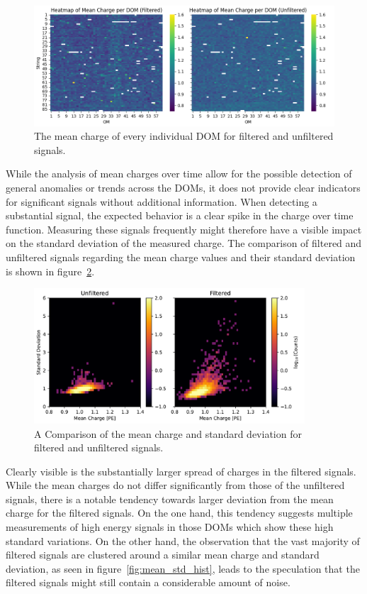 \begin{figure}[H]
    \centering
    \includegraphics[width=\textwidth]{Plots/mean_charge_all_dom.png}
    \caption{The mean charge of every individual DOM for filtered and unfiltered signals.}
    \label{fig:mean_dom_charge_pq}
\end{figure}

While the analysis of mean charges over time allow for the possible detection of general anomalies or trends across the DOMs, it does not provide clear indicators for 
significant signals without additional information. When detecting a substantial signal, the expected behavior is a clear spike in the charge over time function. 
Measuring these signals frequently might therefore have a visible impact on the standard deviation of the measured charge. The comparison of filtered and unfiltered 
signals regarding the mean charge values and their standard deviation is shown in figure~\ref{fig:mean_std_comp}.

\begin{figure}[H]
    \centering
    \includegraphics[width=0.9\textwidth]{Plots/mean_std_charge.pdf}
    \caption{A Comparison of the mean charge and standard deviation for filtered and unfiltered signals.}
    \label{fig:mean_std_comp}
\end{figure}

Clearly visible is the substantially larger spread of charges in the filtered signals. While the mean charges do not differ significantly from those of the 
unfiltered signals, there is a notable tendency towards larger deviation from the mean charge for the filtered signals. 
On the one hand, this tendency suggests multiple measurements of high energy signals in those DOMs which show these high standard variations. On the other hand,
the observation that the vast 
majority of filtered signals are clustered around a similar mean charge and standard deviation, as seen in figure~\ref{fig:mean_std_hist}, leads to the speculation 
that the filtered signals might still contain a considerable amount of noise.

